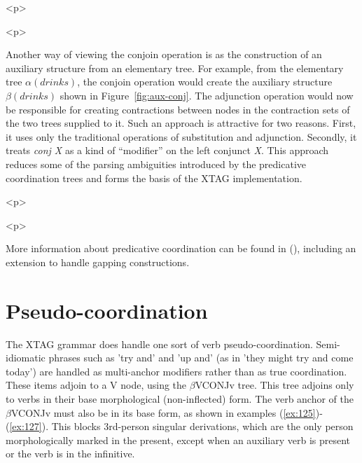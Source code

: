 
\begin{rawhtml} <p> \end{rawhtml}
  \begin{center} 
    \leavevmode 
  \end{center} 
  \begin{rawhtml} <dl> <dt>{An example of the  conjoin\/ operation. $\{1\$     denotes a shared dependency. <p> </dl> \end{rawhtml}
  \label{fig:vpc} 
\begin{rawhtml} <p> \end{rawhtml}
 
Another way of viewing the conjoin operation is as the construction of 
an auxiliary structure from an elementary tree. For example, from the 
elementary tree $\alpha(drinks)$, the conjoin operation would create 
the auxiliary structure $\beta(drinks)$ shown in 
Figure~\ref{fig:aux-conj}. The adjunction operation would now be 
responsible for creating contractions between nodes in the contraction 
sets of the two trees supplied to it. Such an approach is attractive 
for two reasons. First, it uses only the traditional operations of 
substitution and adjunction. Secondly, it treats {\em conj X} as a 
kind of ``modifier'' on the left conjunct {\em X}. This approach 
reduces some of the parsing ambiguities introduced by the predicative 
coordination trees and forms the basis of the XTAG implementation. 
 
\begin{rawhtml} <p> \end{rawhtml}
  \begin{center} 
    \leavevmode 
  \end{center} 
  \begin{rawhtml} <dl> <dt>{Coordination as adjunction. <p> </dl> \end{rawhtml}
  \label{fig:aux-conj} 
\begin{rawhtml} <p> \end{rawhtml}
 
More information about predicative coordination can be found in 
(\cite{anoopjoshi96}), including an extension to handle gapping constructions. 
 
\section{Pseudo-coordination} 
 
The XTAG grammar does handle one sort of verb pseudo-coordination. 
Semi-idiomatic phrases such as 'try and' and 'up and' (as in 'they might 
try and come today') are handled as multi-anchor modifiers 
rather than as true coordination. These items adjoin to a V node, using 
the $\beta$VCONJv tree. This tree adjoins only to verbs in their base 
morphological (non-inflected) form. The verb anchor of the $\beta$VCONJv 
must also be in its base form, as shown in examples 
(\ref{ex:125})-(\ref{ex:127}). This blocks 3rd-person singular derivations, 
which are the only person morphologically marked in the present, except when 
an auxiliary verb is present or the verb is in the infinitive. 
 

